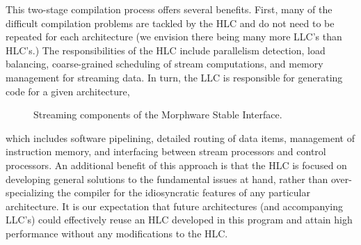 This two-stage compilation process offers several benefits.  First,
many of the difficult compilation problems are tackled by the HLC and
do not need to be repeated for each architecture (we envision there
being many more LLC's than HLC's.)  The responsibilities of the HLC
include parallelism detection, load balancing, coarse-grained
scheduling of stream computations, and memory management for streaming
data. In turn, the LLC is responsible for generating code for a given
architecture, 
\begin{figure}[h]
\begin{center}
\caption{Streaming components of the Morphware Stable Interface.\protect\label{fig:msi}}
\end{center}
\vspace{-6pt}
\end{figure}
which includes software pipelining, detailed routing of data items,
management of instruction memory, and interfacing between stream
processors and control processors.  An additional benefit of this
approach is that the HLC is focused on developing general solutions to
the fundamental issues at hand, rather than over-specializing the
compiler for the idiosyncratic features of any particular
architecture.  It is our expectation that future architectures (and
accompanying LLC's) could effectively reuse an HLC developed in this
program and attain high performance without any modifications to the
HLC.

